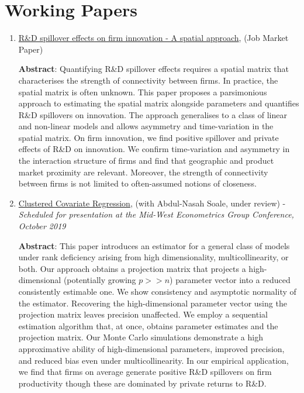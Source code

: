 \documentclass[12pt,letterpaper]{article}
\begin{document}
\section*{Working Papers} %
\begin{enumerate}
	\item  \href{https://estsyawo.github.io/Tsyawo_JMP.pdf#}{R\&D spillover effects on firm innovation - A spatial approach}, (Job Market Paper)
	
	\textbf{Abstract}: Quantifying R\&D spillover effects requires a spatial matrix that characterises the strength
of connectivity between firms. In practice, the spatial matrix is often unknown. This paper
	proposes a parsimonious approach to estimating the spatial matrix alongside parameters and
	quantifies R\&D spillovers on innovation. The approach generalises to a class of linear and
non-linear models and allows asymmetry and time-variation in the spatial matrix. On firm	innovation, we find positive spillover and private effects of R\&D on innovation. We confirm
time-variation and asymmetry in the interaction structure of firms and find that geographic
and product market proximity are relevant. Moreover, the strength of connectivity between
firms is not limited to often-assumed notions of closeness.
	
	\item \href{https://papers.ssrn.com/sol3/papers.cfm?abstract_id=3394012}{Clustered Covariate Regression}, (with Abdul-Nasah Soale, under review) - \textit{Scheduled for presentation at the Mid-West Econometrics Group Conference, October 2019}
	
	\textbf{Abstract}: This paper introduces an estimator for a general class of models under rank deficiency arising from high dimensionality, multicollinearity, or both. Our approach obtains a projection matrix that projects a high-dimensional (potentially growing $ p >> n $) parameter vector into a reduced consistently estimable one. We show consistency and asymptotic normality of the estimator. Recovering the high-dimensional parameter vector using the projection matrix leaves precision unaffected. We employ a sequential estimation algorithm that, at once, obtains parameter estimates and the projection matrix. Our Monte Carlo simulations demonstrate a high approximative ability of high-dimensional parameters, improved precision, and reduced bias even under multicollinearity. In our empirical application, we find that firms on average generate positive R\&D spillovers on firm productivity though these are dominated by private returns to R\&D.
	

\end{enumerate}
\end{document}
